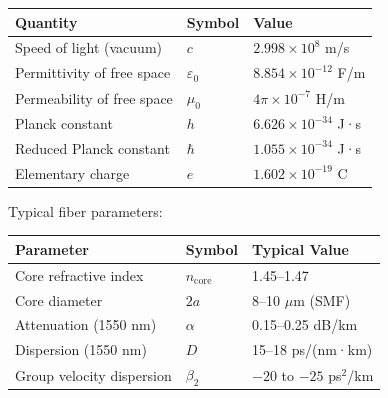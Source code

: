 \documentclass[12pt,a4paper]{article}
\begin{document}
\begin{center}
\begin{tabular}{lll}
\hline
Quantity & Symbol & Value \\
\hline
Speed of light (vacuum) & $c$ & $2.998 \times 10^8$ m/s \\
Permittivity of free space & $\varepsilon_0$ & $8.854 \times 10^{-12}$ F/m \\
Permeability of free space & $\mu_0$ & $4\pi \times 10^{-7}$ H/m \\
Planck constant & $h$ & $6.626 \times 10^{-34}$ J·s \\
Reduced Planck constant & $\hbar$ & $1.055 \times 10^{-34}$ J·s \\
Elementary charge & $e$ & $1.602 \times 10^{-19}$ C \\
\hline
\end{tabular}
\end{center}

Typical fiber parameters:
\begin{center}
\begin{tabular}{lll}
\hline
Parameter & Symbol & Typical Value \\
\hline
Core refractive index & $n_{\text{core}}$ & 1.45--1.47 \\
Core diameter & $2a$ & 8--10 $\mu$m (SMF) \\
Attenuation (1550 nm) & $\alpha$ & 0.15--0.25 dB/km \\
Dispersion (1550 nm) & $D$ & 15--18 ps/(nm·km) \\
Group velocity dispersion & $\beta_2$ & $-20$ to $-25$ ps$^2$/km \\
\hline
\end{tabular}
\end{center}
\end{document}
